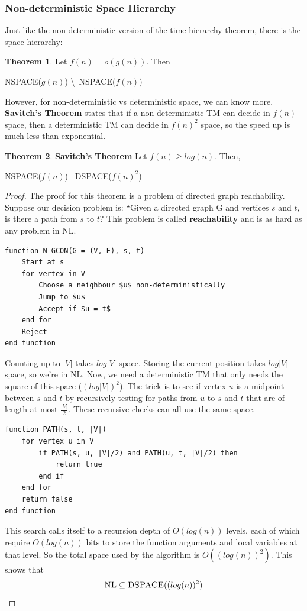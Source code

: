 \documentclass{article}
\theoremstyle{definition}
\newtheorem{theorem}{Theorem}[section]
\begin{document}
\subsubsection{Non-deterministic Space Hierarchy}
Just like the non-deterministic version of the time hierarchy theorem, there is the space hierarchy:
\begin{theorem}
Let $f(n) = o(g(n))$. Then
\begin{center}
\textsc{NSPACE}($g(n)$) \textbackslash\ \textsc{NSPACE}($f(n)$) \neq {}
\end{center}
\end{theorem}
\noindent
However, for non-deterministic vs deterministic space, we can know more. \textbf{Savitch's Theorem} states that if a non-deterministic TM can decide in $f(n)$ space, then a deterministic TM can decide in $f(n)^2$ space, so the speed up is much less than exponential. 
\begin{theorem}{\textbf{Savitch's Theorem}}
Let $f(n) \geq log(n)$. Then,
\begin{center}
\textsc{NSPACE}($f(n)$) \subseteq\ \textsc{DSPACE}($f(n)^2$)
\end{center}
\end{theorem}
\begin{proof}
The proof for this theorem is a problem of directed graph reachability. Suppose our decision problem is: ``Given a directed graph G and vertices $s$ and $t$, is there a path from $s$ to $t$? This problem is called \textbf{reachability} and is as hard as any problem in NL.
\begin{lstlisting}[caption={Proof Sketch of Savitch's Theorem}, label=algo:savitch1]
function N-GCON(G = (V, E), s, t)
	Start at s
	for vertex in V
		Choose a neighbour $u$ non-deterministically
		Jump to $u$
		Accept if $u = t$
	end for
	Reject
end function
\end{lstlisting}
\noindent
Counting up to $|V|$ takes $log|V|$ space. Storing the current position takes $log|V|$ space, so we're in \textsc{NL}. Now, we need a deterministic TM that only needs the square of this space ($(log|V|)^2$). The trick is to see if vertex $u$ is a midpoint between $s$ and $t$ by recursively testing for paths from $u$ to $s$ and $t$ that are of length at most $\frac{|V|}{2}$. These recursive checks can all use the same space.
\begin{lstlisting}[caption={Finding midpoint path}, label=algo:savitch2]
function PATH(s, t, |V|)
	for vertex u in V
		if PATH(s, u, |V|/2) and PATH(u, t, |V|/2) then
			return true
		end if
	end for
	return false
end function
\end{lstlisting}
\noindent
This search calls itself to a recursion depth of $O(log(n))$ levels, each of which require $O(log(n))$ bits to store the function arguments and local variables at that level. So the total space used by the algorithm is $O((log(n))^2)$. This shows that
\begin{equation}
\textsc{NL} \subseteq \textsc{DSPACE}((log(n))^2)
\end{equation}
\end{proof}
\end{document}
